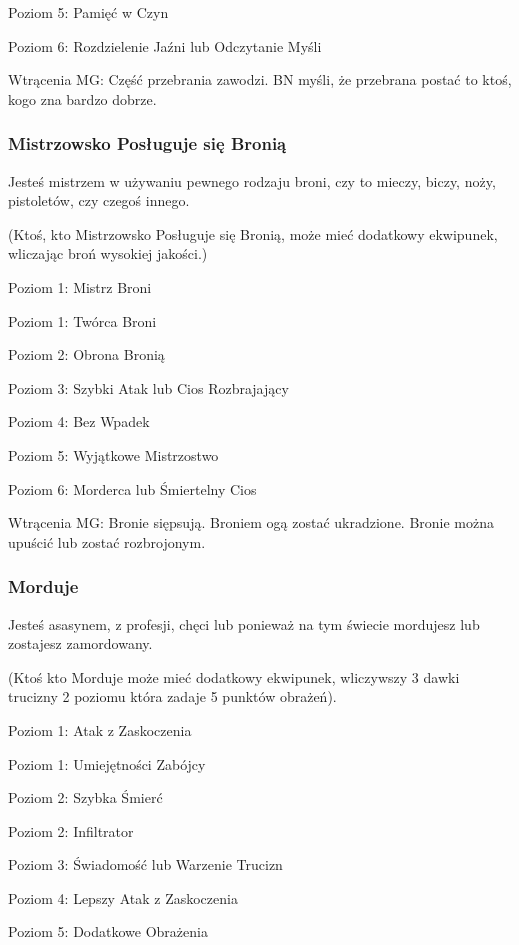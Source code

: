 Poziom 5: Pamięć w Czyn

Poziom 6: Rozdzielenie Jaźni lub Odczytanie Myśli

Wtrącenia MG: Część przebrania zawodzi. BN myśli, że przebrana postać to ktoś, kogo zna bardzo dobrze.

\subsubsection{Mistrzowsko Posługuje się Bronią}

Jesteś mistrzem w używaniu pewnego rodzaju broni, czy to mieczy, biczy, noży, pistoletów, czy czegoś innego.

(Ktoś, kto Mistrzowsko Posługuje się Bronią, może mieć dodatkowy ekwipunek, wliczając broń wysokiej jakości.)

Poziom 1: Mistrz Broni

Poziom 1: Twórca Broni

Poziom 2: Obrona Bronią

Poziom 3: Szybki Atak lub Cios Rozbrajający

Poziom 4: Bez Wpadek

Poziom 5: Wyjątkowe Mistrzostwo

Poziom 6: Morderca lub Śmiertelny Cios

Wtrącenia MG: Bronie siępsują. Broniem ogą zostać ukradzione. Bronie można upuścić lub zostać rozbrojonym. 

\subsubsection{Morduje}

Jesteś asasynem, z profesji, chęci lub ponieważ na tym świecie mordujesz lub zostajesz zamordowany.

(Ktoś kto Morduje może mieć dodatkowy ekwipunek, wliczywszy 3 dawki trucizny 2 poziomu która zadaje 5 punktów obrażeń). 

Poziom 1: Atak z Zaskoczenia

Poziom 1: Umiejętności Zabójcy

Poziom 2: Szybka Śmierć

Poziom 2: Infiltrator

Poziom 3: Świadomość lub Warzenie Trucizn

Poziom 4: Lepszy Atak z Zaskoczenia

Poziom 5: Dodatkowe Obrażenia

